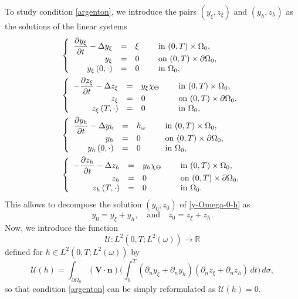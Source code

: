 \documentclass[11pt]{article}
\makeatletter
\numberwithin{equation}{section}
\newcommand{\bn}{\boldsymbol{n}}
\newcommand{\bV}{\boldsymbol{V}}
\DeclareRobustCommand{\mathbbm}[1]{\csname jepbb@#1\endcsname}
\newcommand\R{{\mathbb R}}
\theoremstyle{definition}
\makeatother
\begin{document}
To study condition \eqref{argenton}, we introduce the pairs $(y_\xi,z_\xi)$ and $(y_h,z_h)$ as the solutions of the linear systems
\begin{align}
&\left\{
\begin{array}{rcll}
\dfrac{\partial y_\xi}{\partial t}-\Delta y_\xi &=&\xi \quad&\text{ in } (0,T) \times \Omega_0,
\\
y_\xi &=& 0 &\text{ on }(0,T) \times \partial \Omega_0,
\\
y_\xi\left(0,\cdot \right) &=& 0 &\text{ in }\Omega_{0},
\end{array}
\right.
\label{cou1b}
\\
&\left\{
\begin{array}{rcll}
-\dfrac{\partial z_\xi}{\partial t}-\Delta z_\xi &=& y_\xi\chi_{\Theta}\quad&\text{ in } (0,T) \times \Omega_0,
\\
z_\xi&=& 0 &\text{ on }(0,T) \times \partial \Omega_0,
\\
z_\xi\left(T,\cdot\right) &=& 0 &\text{ in }\Omega_{0},
\end{array}
\right.
\label{cou2b}
\\
&\left\{
\begin{array}{rcll}
\dfrac{\partial y_h}{\partial t}-\Delta y_h &=& h\mathbbm{1}_{\omega} \quad&\text{ in } (0,T) \times \Omega_0,
\\
y_h &=& 0 &\text{ on }(0,T) \times \partial \Omega_0,
\\
y_h \left(0,\cdot \right) &=& 0 &\text{ in }\Omega_{0},
\end{array}
\right.
\label{cou1bis}
\\
&\left\{
\begin{array}{rcll}
-\dfrac{\partial z_h}{\partial t}-\Delta z_h &=& {y_h}\chi_{\Theta}\quad&\text{ in }(0,T) \times \Omega_0,
\\
z_h &=& 0 &\text{ on }(0,T) \times \partial \Omega_0,
\\
z_h\left(T,\cdot\right) &=& 0 &\text{ in }\Omega_{0}.
\end{array}
\right.
\label{cou2bis}
\end{align}
This allows to decompose the solution $(y_0,z_0)$ of \eqref{y-Omega-0-h} as
\[
y_{0}=y_\xi+y_h, \quad\text{and} \quad z_{0}=z_\xi+z_h.
\]
Now, we introduce the function
\[
\mathcal{U}: L^2(0,T; L^2(\omega)) \to \R
\]
defined for $h \in L^2(0,T; L^2(\omega))$ by
\begin{equation*}
\mathcal{U}(h) =
\int_{\partial\Omega_{0}}(\bV\cdot \bn)
\biggl(\int_{0}^{T}(\partial_{n}y_{\xi} + \partial_n y_h) (\partial_{n} z_{\xi} + \partial_n z_h)\, dt \biggr)\,
d\sigma,
\end{equation*}
so that condition \eqref{argenton} can be simply reformulated as $\mathcal{U}(h) = 0$.
\end{document}
